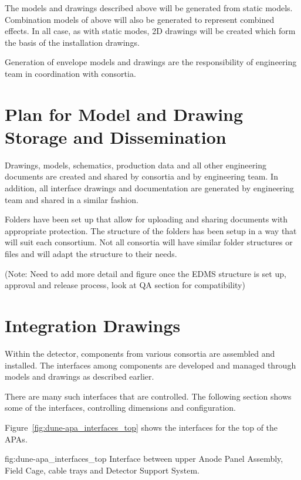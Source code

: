 The models and drawings described above will be generated from static
models. Combination models of above will also be generated to
represent combined effects. In all case, as with static modes, 2D
drawings will be created which form the basis of the installation
drawings.

Generation of envelope models and drawings are the responsibility of
 engineering team in coordination with consortia.


\section{Plan for Model and Drawing Storage and Dissemination}
\label{sec:fdsp-coord-integ-modelplan}
Drawings, models, schematics, production data and all other
engineering documents are created and shared by consortia and by
 engineering team. In addition, all interface drawings and
documentation are generated by  engineering team and shared
in a similar fashion.

Folders have been set up that allow for uploading and sharing
documents with appropriate protection. The structure of the folders
has been setup in a way that will suit each consortium. Not all
consortia will have similar folder structures or files and will adapt
the structure to their needs.

(Note: Need to add more detail and figure once the EDMS structure is
set up, approval and release process, look at QA section for
compatibility)

\section{Integration Drawings}
\label{sec:fdsp-coord-integ-drawings}
Within the detector, components from various consortia are assembled
and installed. The interfaces among components are developed and
managed through models and drawings as described earlier.

There are many such interfaces that are controlled. The following
section shows some of the interfaces, controlling dimensions and
configuration.

Figure~\ref{fig:dune-apa_interfaces_top} shows the interfaces for the top of the APAs.
\begin{dunefigure}{fig:dune-apa_interfaces_top}
  {Interface between upper Anode Panel Assembly, Field Cage, cable trays and Detector Support System.}
\end{dunefigure}

